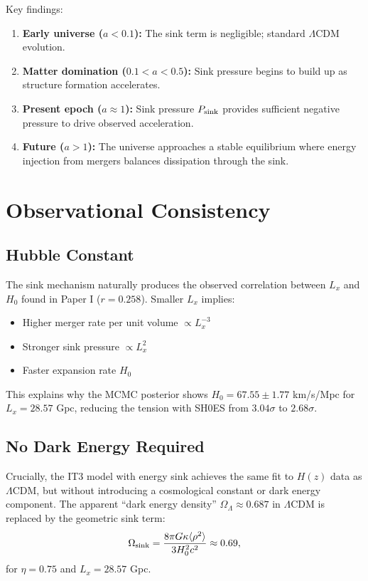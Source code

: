 \documentclass[12pt,a4paper]{article}
\begin{document}
Key findings:
\begin{enumerate}
    \item \textbf{Early universe ($a < 0.1$):} The sink term is negligible; standard $\Lambda$CDM evolution.
    \item \textbf{Matter domination ($0.1 < a < 0.5$):} Sink pressure begins to build up as structure formation accelerates.
    \item \textbf{Present epoch ($a \approx 1$):} Sink pressure $P_{\rm sink}$ provides sufficient negative pressure to drive observed acceleration.
    \item \textbf{Future ($a > 1$):} The universe approaches a stable equilibrium where energy injection from mergers balances dissipation through the sink.
\end{enumerate}

\section{Observational Consistency}

\subsection{Hubble Constant}

The sink mechanism naturally produces the observed correlation between $L_x$ and $H_0$ found in Paper I ($r = 0.258$). Smaller $L_x$ implies:
\begin{itemize}
    \item Higher merger rate per unit volume $\propto L_x^{-3}$
    \item Stronger sink pressure $\propto L_x^2$
    \item Faster expansion rate $H_0$
\end{itemize}

This explains why the MCMC posterior shows $H_0 = 67.55 \pm 1.77$ km/s/Mpc for $L_x = 28.57$ Gpc, reducing the tension with SH0ES from $3.04\sigma$ to $2.68\sigma$.

\subsection{No Dark Energy Required}

Crucially, the IT3 model with energy sink achieves the same fit to $H(z)$ data as $\Lambda$CDM, but without introducing a cosmological constant or dark energy component. The apparent ``dark energy density'' $\Omega_\Lambda \approx 0.687$ in $\Lambda$CDM is replaced by the geometric sink term:
\begin{equation}
\Omega_{\rm sink} = \frac{8\pi G \kappa \langle \rho^2 \rangle}{3H_0^2 c^2} \approx 0.69,
\end{equation}
for $\eta = 0.75$ and $L_x = 28.57$ Gpc.
\end{document}
